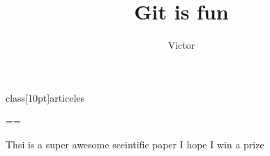  \document class[10pt]{articeles}
\author { Victor}
\title{Git is fun}

      \maketitle
==

      Thsi is a super awesome sceintific paper
      I hope I win a prize

